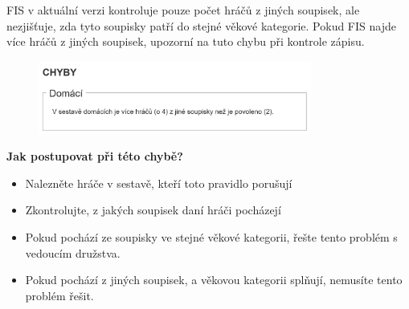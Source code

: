\documentclass{newsletter_2025}
\begin{document}
FIS v aktuální verzi kontroluje pouze počet hráčů z jiných soupisek, ale nezjišťuje, zda tyto soupisky patří do stejné věkové kategorie. Pokud FIS najde více hráčů z jiných soupisek, upozorní na tuto chybu při kontrole zápisu.

\begin{figure}[h]
	\centering
	\includegraphics[width=0.8\textwidth]{chyba_pravidlo_2_1}\linebreak
	{\small{}}
\end{figure}

\textbf{Jak postupovat při této chybě?}
\begin{itemize}
	\item Nalezněte hráče v sestavě, kteří toto pravidlo porušují
	\item Zkontrolujte, z jakých soupisek daní hráči pocházejí
	\item Pokud pochází ze soupisky ve stejné věkové kategorii, řešte tento problém s vedoucím družstva.
	\item Pokud pochází z jiných soupisek, a věkovou kategorii splňují, nemusíte tento problém řešit.
\end{itemize}
\end{document}
